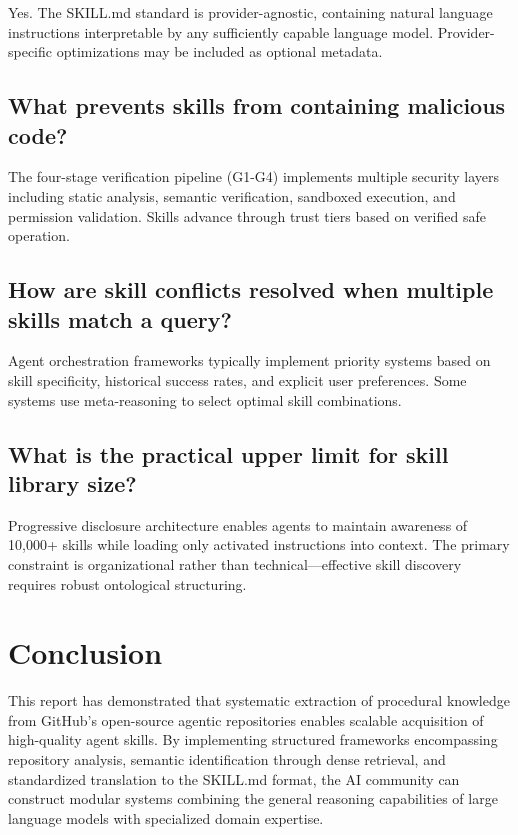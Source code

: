 \documentclass[11pt,a4paper]{article}
\begin{document}
Yes. The SKILL.md standard is provider-agnostic, containing natural language instructions interpretable by any sufficiently capable language model. Provider-specific optimizations may be included as optional metadata.

\subsection{What prevents skills from containing malicious code?}

The four-stage verification pipeline (G1-G4) implements multiple security layers including static analysis, semantic verification, sandboxed execution, and permission validation. Skills advance through trust tiers based on verified safe operation.

\subsection{How are skill conflicts resolved when multiple skills match a query?}

Agent orchestration frameworks typically implement priority systems based on skill specificity, historical success rates, and explicit user preferences. Some systems use meta-reasoning to select optimal skill combinations.

\subsection{What is the practical upper limit for skill library size?}

Progressive disclosure architecture enables agents to maintain awareness of 10,000+ skills while loading only activated instructions into context. The primary constraint is organizational rather than technical---effective skill discovery requires robust ontological structuring.

\section{Conclusion}

This report has demonstrated that systematic extraction of procedural knowledge from GitHub's open-source agentic repositories enables scalable acquisition of high-quality agent skills. By implementing structured frameworks encompassing repository analysis, semantic identification through dense retrieval, and standardized translation to the SKILL.md format, the AI community can construct modular systems combining the general reasoning capabilities of large language models with specialized domain expertise.
\end{document}
